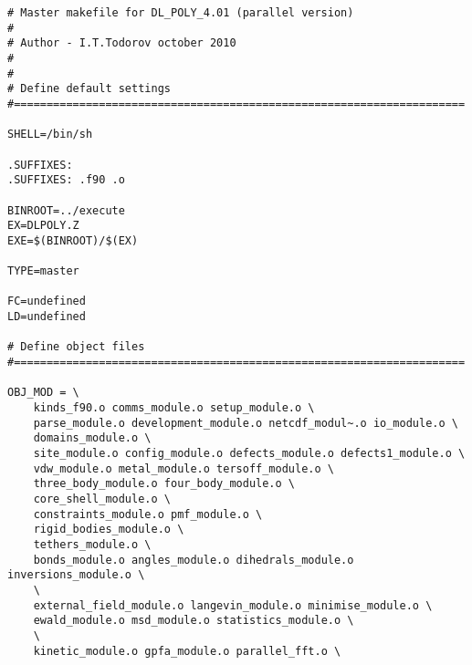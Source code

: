\begin{verbatim}
# Master makefile for DL_POLY_4.01 (parallel version)
#
# Author - I.T.Todorov october 2010
#
#
# Define default settings
#=====================================================================

SHELL=/bin/sh

.SUFFIXES:
.SUFFIXES: .f90 .o

BINROOT=../execute
EX=DLPOLY.Z
EXE=$(BINROOT)/$(EX)

TYPE=master

FC=undefined
LD=undefined

# Define object files
#=====================================================================

OBJ_MOD = \
	kinds_f90.o comms_module.o setup_module.o \
	parse_module.o development_module.o netcdf_modul~.o io_module.o \
	domains_module.o \
	site_module.o config_module.o defects_module.o defects1_module.o \
	vdw_module.o metal_module.o tersoff_module.o \
	three_body_module.o four_body_module.o \
	core_shell_module.o \
	constraints_module.o pmf_module.o \
	rigid_bodies_module.o \
	tethers_module.o \
	bonds_module.o angles_module.o dihedrals_module.o inversions_module.o \
	\
	external_field_module.o langevin_module.o minimise_module.o \
	ewald_module.o msd_module.o statistics_module.o \
	\
	kinetic_module.o gpfa_module.o parallel_fft.o \


\end{verbatim}

